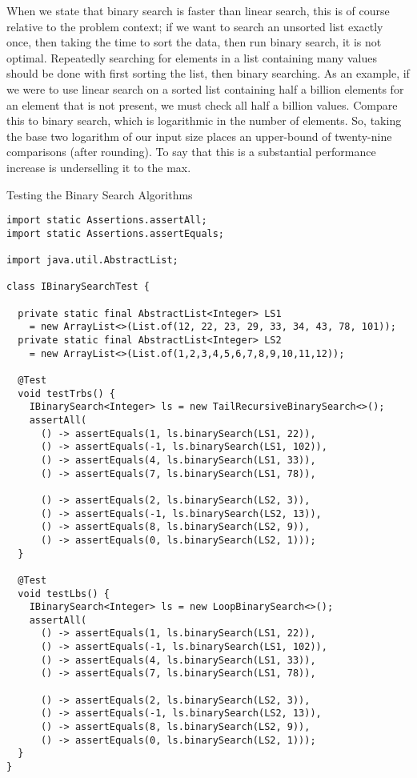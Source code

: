 When we state that binary search is faster than linear search, this is of course relative to the problem context; if we want to search an unsorted list exactly once, then taking the time to sort the data, then run binary search, it is not optimal. Repeatedly searching for elements in a list containing many values should be done with first sorting the list, then binary searching. As an example, if we were to use linear search on a sorted list containing half a billion elements for an element that is not present, we must check all half a billion values. Compare this to binary search, which is logarithmic in the number of elements. So, taking the base two logarithm of our input size places an upper-bound of twenty-nine comparisons (after rounding). To say that this is a substantial performance increase is underselling it to the max.

\begin{cl}[]{Testing the Binary Search Algorithms}
\begin{lstlisting}[language=MyJava]
import static Assertions.assertAll;
import static Assertions.assertEquals;

import java.util.AbstractList;

class IBinarySearchTest {
  
  private static final AbstractList<Integer> LS1 
    = new ArrayList<>(List.of(12, 22, 23, 29, 33, 34, 43, 78, 101));
  private static final AbstractList<Integer> LS2 
    = new ArrayList<>(List.of(1,2,3,4,5,6,7,8,9,10,11,12));

  @Test
  void testTrbs() {
    IBinarySearch<Integer> ls = new TailRecursiveBinarySearch<>();
    assertAll(
      () -> assertEquals(1, ls.binarySearch(LS1, 22)),
      () -> assertEquals(-1, ls.binarySearch(LS1, 102)),
      () -> assertEquals(4, ls.binarySearch(LS1, 33)),
      () -> assertEquals(7, ls.binarySearch(LS1, 78)),

      () -> assertEquals(2, ls.binarySearch(LS2, 3)),
      () -> assertEquals(-1, ls.binarySearch(LS2, 13)),
      () -> assertEquals(8, ls.binarySearch(LS2, 9)),
      () -> assertEquals(0, ls.binarySearch(LS2, 1)));
  }
  
  @Test
  void testLbs() {
    IBinarySearch<Integer> ls = new LoopBinarySearch<>();
    assertAll(
      () -> assertEquals(1, ls.binarySearch(LS1, 22)),
      () -> assertEquals(-1, ls.binarySearch(LS1, 102)),
      () -> assertEquals(4, ls.binarySearch(LS1, 33)),
      () -> assertEquals(7, ls.binarySearch(LS1, 78)),

      () -> assertEquals(2, ls.binarySearch(LS2, 3)),
      () -> assertEquals(-1, ls.binarySearch(LS2, 13)),
      () -> assertEquals(8, ls.binarySearch(LS2, 9)),
      () -> assertEquals(0, ls.binarySearch(LS2, 1)));
  }
}
\end{lstlisting}
\end{cl}

